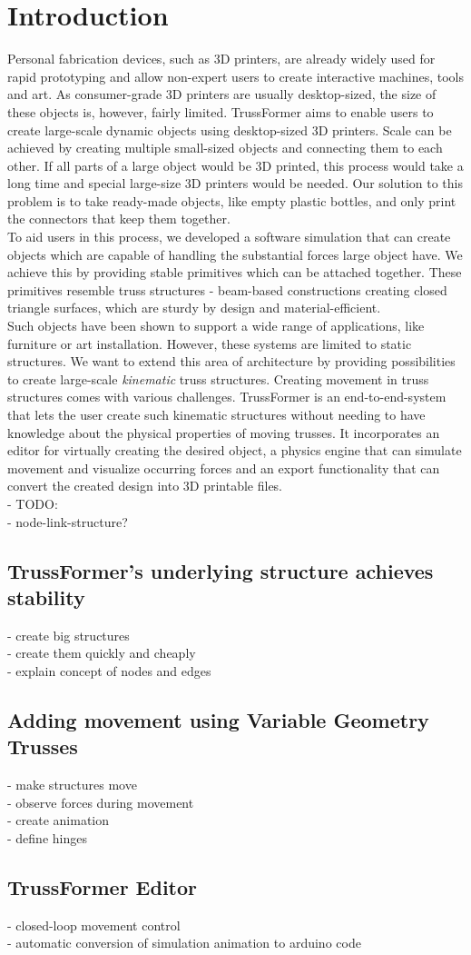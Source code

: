 \chapter{Introduction}\label{ch:introduction}
Personal fabrication devices, such as 3D printers, are already widely used for rapid prototyping and allow non-expert users to create interactive machines, tools and art. As consumer-grade 3D printers are usually desktop-sized, the size of these objects is, however, fairly limited. TrussFormer aims to enable users to create large-scale dynamic objects using desktop-sized 3D printers. Scale can be achieved by creating multiple small-sized objects and connecting them to each other. If all parts of a large object would be 3D printed, this process would take a long time and special large-size 3D printers would be needed. Our solution to this problem is to take ready-made objects, like empty plastic bottles, and only print the connectors that keep them together.\\
To aid users in this process, we developed a software simulation that can create objects which are capable of handling the substantial forces large object have. We achieve this by providing stable primitives which can be attached together. These primitives resemble truss structures - beam-based constructions creating closed triangle surfaces, which are sturdy by design and material-efficient.\\
Such objects have been shown to support a wide range of applications, like furniture or art installation. However, these systems are limited to static structures. We want to extend this area of architecture by providing possibilities to create large-scale \textit{kinematic} truss structures. Creating movement in truss structures comes with various challenges. TrussFormer is an end-to-end-system that lets the user create such kinematic structures without needing to have knowledge about the physical properties of moving trusses. It incorporates an editor for virtually creating the desired object, a physics engine that can simulate movement and visualize occurring forces and an export functionality that can convert the created design into 3D printable files.\\
- TODO:\\
- node-link-structure?\\
\section{TrussFormer’s underlying structure achieves stability}
- create big structures\\
- create them quickly and cheaply\\
- explain concept of nodes and edges\\
\section{Adding movement using Variable Geometry Trusses}
- make structures move\\
- observe forces during movement\\
- create animation\\
- define hinges\\
\section{TrussFormer Editor}
- closed-loop movement control\\
- automatic conversion of simulation animation to arduino code\\
